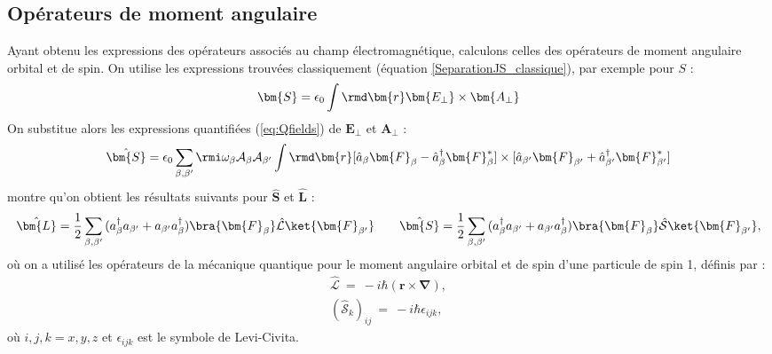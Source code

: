 \subsection{Opérateurs de moment angulaire}
Ayant obtenu les expressions des opérateurs associés au champ électromagnétique, calculons celles des opérateurs de moment angulaire orbital et de spin. On utilise les expressions trouvées classiquement (équation \ref{SeparationJS_classique}), par exemple pour $S$ : 
\begin{equation*}
\bm{S}=\epsilon_0\int{\rmd\bm{r}\bm{E_{\bot}}\times\bm{A_{\bot}}}
\end{equation*}
On substitue alors les expressions quantifiées (\ref{eq:Qfields}) de $\bm{E_{\bot}}$ et $\bm{A_{\bot}}$ :
\begin{equation*}
\hat{\bm{S}}= \epsilon_0 \sum_{\beta,\beta '} \rmi \omega_{\beta}\mathcal{A}_{\beta}\mathcal{A}_{\beta '}\int{\rmd\bm{r}
[\hat{a}_{\beta}\bm{F}_{\beta}-\hat{a}^{\dag}_{\beta}\bm{F}^*_{\beta}]\times[\hat{a}_{\beta '}\bm{F}_{\beta '}+\hat{a}^{\dag}_{\beta '}\bm{F}^*_{\beta '}}]\\
\end{equation*}
 montre qu'on obtient les résultats suivants pour $\hat{\bm{S}}$ et $\hat{\bm{L}}$ :
\begin{equation}
\begin{aligned}[c]
\hat{\bm{L}}=\frac{1}{2}\sum_{\beta,\beta'}{(a^{\dag}_{\beta}a_{\beta'}+a_{\beta'}a^{\dag}_{\beta})}\bra{\bm{F}_\beta}\hat{\mathcal{L}}\ket{\bm{F}_{\beta'}}
\end{aligned}
\qquad
\begin{aligned}[c]
\hat{\bm{S}}=\frac{1}{2}\sum_{\beta,\beta'}{(a^{\dag}_{\beta}a_{\beta'}+a_{\beta'}a^{\dag}_{\beta})}\bra{\bm{F}_\beta}\hat{\mathcal{S}}\ket{\bm{F}_{\beta'}},
\end{aligned}
\label{eqLS_QED}
\end{equation}
où on a utilisé les opérateurs de la mécanique quantique pour le moment angulaire orbital et de spin d'une particule de spin 1, définis par :
\begin{equation}
\begin{aligned}
\hat{\mathcal{L}}~=~-i\hbar(\bm{r}\times\bm{\nabla}),\\
(\hat{\mathcal{S}}_k)_{ij}~=~-i\hbar\epsilon_{ijk},
\end{aligned} 
\label{defLS_hat}
\end{equation}
où $i,j,k=x,y,z$ et $\epsilon_{ijk}$ est le symbole de Levi-Civita.

